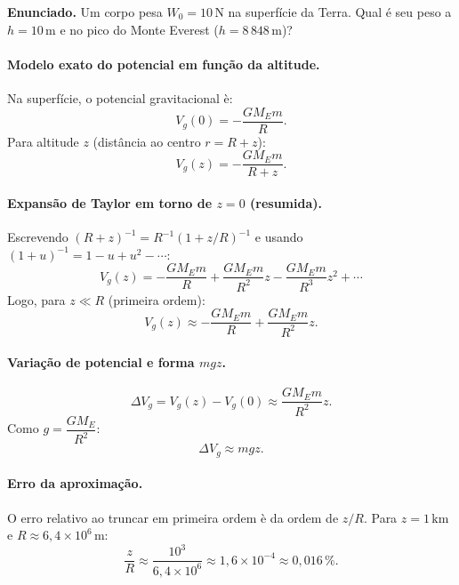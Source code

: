 \documentclass[12pt,a4paper]{article}
\theoremstyle{definition}
\begin{document}
\textbf{Enunciado.} Um corpo pesa $W_0 = 10\,\text{N}$ na superf\'icie da Terra.
Qual \'e seu peso a $h = 10\,\text{m}$ e no pico do Monte Everest ($h = 8\,848\,\text{m}$)?

\paragraph{Modelo exato do potencial em fun\c{c}\~ao da altitude.}
Na superf\'icie, o potencial gravitacional \`e:
\begin{equation}
  V_g(0) = -\frac{G M_E m}{R}.
\end{equation}
Para altitude $z$ (dist\^ancia ao centro $r=R+z$):
\begin{equation}
  V_g(z) = -\frac{G M_E m}{R+z}.
\end{equation}

\paragraph{Expans\~ao de Taylor em torno de $z=0$ (resumida).}
Escrevendo $(R+z)^{-1}=R^{-1}(1+z/R)^{-1}$ e usando
$(1+u)^{-1}=1-u+u^2-\cdots$:
\begin{equation}
  V_g(z)
  = -\frac{G M_E m}{R}
    + \frac{G M_E m}{R^2}z
    - \frac{G M_E m}{R^3}z^2
    + \cdots
\end{equation}
Logo, para $z\ll R$ (primeira ordem):
\begin{equation}
  V_g(z) \approx -\frac{G M_E m}{R} + \frac{G M_E m}{R^2}z.
\end{equation}

\paragraph{Varia\c{c}\~ao de potencial e forma $mgz$.}
\begin{equation}
  \Delta V_g = V_g(z)-V_g(0) \approx \frac{G M_E m}{R^2}z.
\end{equation}
Como $g=\dfrac{G M_E}{R^2}$:
\begin{equation}
  \Delta V_g \approx mgz.
\end{equation}

\paragraph{Erro da aproxima\c{c}\~ao.}
O erro relativo ao truncar em primeira ordem \`e da ordem de $z/R$.
Para $z=1\,\text{km}$ e $R\approx 6{,}4\times 10^6\,\text{m}$:
\begin{equation}
  \frac{z}{R} \approx \frac{10^3}{6{,}4\times 10^6} \approx 1{,}6\times10^{-4}
  \approx 0{,}016\,\%.
\end{equation}
\end{document}
